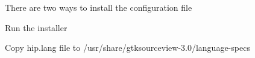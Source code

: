 There are two ways to install the configuration file


\begin{DoxyEnumerate}
\item Run the installer
\item Copy {\ttfamily hip.\+lang} file to {\ttfamily /usr/share/gtksourceview-\/3.0/language-\/specs} 
\end{DoxyEnumerate}